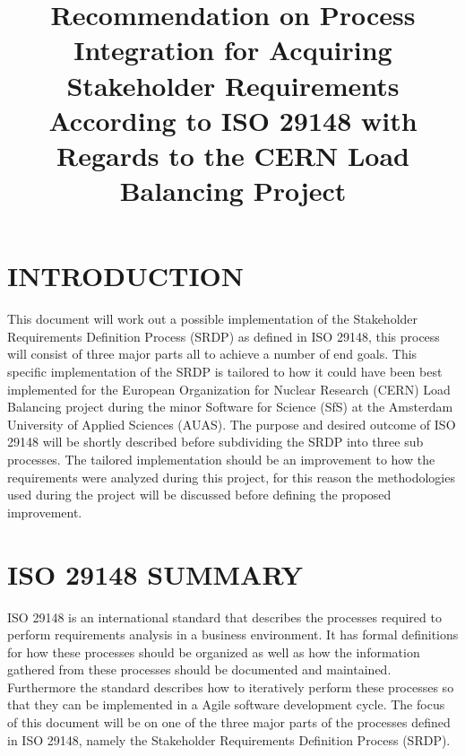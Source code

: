 \documentclass[conference]{IEEEtran}
\begin{document}
\title{Recommendation on Process Integration for Acquiring Stakeholder Requirements According to ISO 29148 with Regards to the CERN Load Balancing Project%
}

\author{
}

\maketitle

\section*{INTRODUCTION}
This document will work out a possible implementation of the Stakeholder Requirements Definition Process (SRDP) as defined in ISO 29148\cite{iso29148}, this process will consist of three major parts all to achieve a number of end goals. This specific implementation of the SRDP is tailored to how it could have been best implemented for the European Organization for Nuclear Research (CERN) Load Balancing project during the minor Software for Science (SfS) at the Amsterdam University of Applied Sciences (AUAS). The purpose and desired outcome of ISO 29148 will be shortly described before subdividing the SRDP into three sub processes. The tailored implementation should be an improvement to how the requirements were analyzed during this project, for this reason the methodologies used during the project will be discussed before defining the proposed improvement.

\section{ISO 29148 SUMMARY}
ISO 29148 is an international standard that describes the processes required to perform requirements analysis in a business environment. It has formal definitions for how these processes should be organized as well as how the information gathered from these processes should be documented and maintained. Furthermore the standard describes how to iteratively perform these processes so that they can be implemented in a Agile software development cycle. The focus of this document will be on one of the three major parts of the processes defined in ISO 29148, namely the Stakeholder Requirements Definition Process (SRDP).
\end{document}
